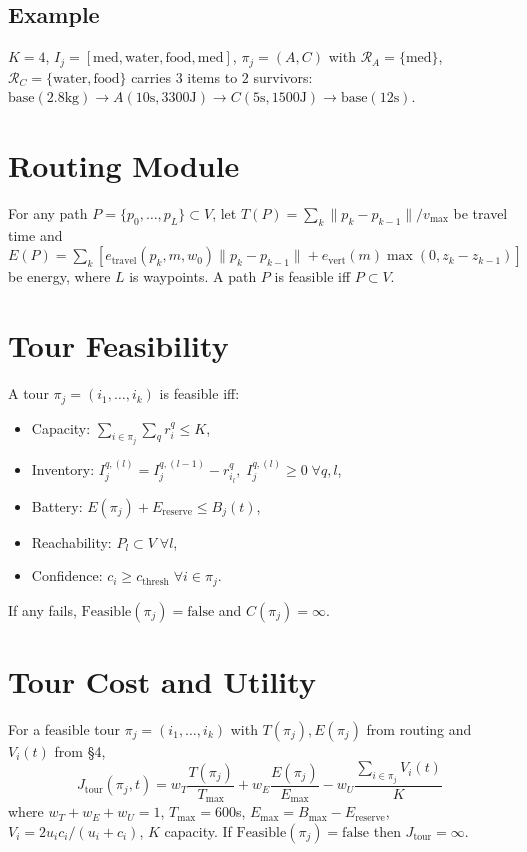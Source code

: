 \documentclass[conference]{IEEEtran}
\begin{document}
\subsection{Example}
$K=4$, $I_j=[\text{med},\text{water},\text{food},\text{med}]$, $\pi_j=(A,C)$ with $\mathcal{R}_A=\{\text{med}\}$, $\mathcal{R}_C=\{\text{water},\text{food}\}$ carries $3$ items to $2$ survivors: $\text{base}(2.8\text{kg})\to A(10\text{s},3300\text{J})\to C(5\text{s},1500\text{J})\to\text{base}(12\text{s})$.

\section{Routing Module}

For any path $P=\{p_0,\dots,p_L\}\subset V$, let $T(P)=\sum_{k}\|p_k-p_{k-1}\|/v_{\max}$ be travel time and $E(P)=\sum_{k}[e_{\text{travel}}(p_k,m,w_0)\|p_k-p_{k-1}\|+e_{\text{vert}}(m)\max(0,z_k-z_{k-1})]$ be energy, where $L$ is waypoints. A path $P$ is feasible iff $P\subset V$.

\section{Tour Feasibility}

A tour $\pi_j=(i_1,\dots,i_k)$ is feasible iff:
\begin{itemize}
\item Capacity: $\sum_{i\in\pi_j}\sum_q r_i^q \leq K$,
\item Inventory: $I_j^{q,(l)}=I_j^{q,(l-1)}-r_{i_l}^q,\; I_j^{q,(l)}\geq0\;\forall q,l$,
\item Battery: $E(\pi_j)+E_{\text{reserve}}\leq B_j(t)$,
\item Reachability: $P_l\subset V\;\forall l$,
\item Confidence: $c_i\geq c_{\text{thresh}}\;\forall i\in\pi_j$.
\end{itemize}
If any fails, $\text{Feasible}(\pi_j)=\text{false}$ and $C(\pi_j)=\infty$.

\section{Tour Cost and Utility}

For a feasible tour $\pi_j=(i_1,\dots,i_k)$ with $T(\pi_j),E(\pi_j)$ from routing and $V_i(t)$ from \S4,
\begin{equation}
J_{\text{tour}}(\pi_j,t)=w_T\frac{T(\pi_j)}{T_{\max}}+w_E\frac{E(\pi_j)}{E_{\max}}-w_U\frac{\sum_{i\in\pi_j}V_i(t)}{K}
\end{equation}
where $w_T+w_E+w_U=1$, $T_{\max}=600$s, $E_{\max}=B_{\max}-E_{\text{reserve}}$, $V_i=2u_ic_i/(u_i+c_i)$, $K$ capacity. If $\text{Feasible}(\pi_j)=\text{false}$ then $J_{\text{tour}}=\infty$.
\end{document}
